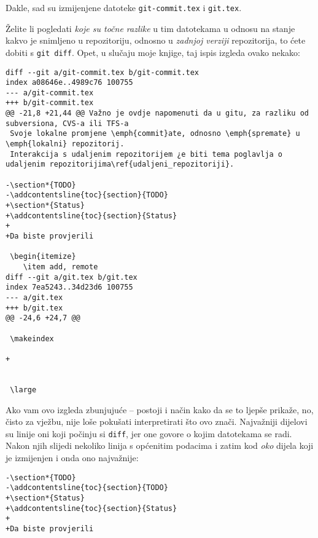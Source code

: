 Dakle, sad su izmijenjene datoteke \verb+git-commit.tex+ i \verb+git.tex+.

Želite li pogledati \emph{koje su točne razlike} u tim datotekama u odnosu na stanje kakvo je snimljeno u repozitoriju, odnosno u \emph{zadnjoj verziji} repozitorija, to ćete dobiti s \verb+git diff+. 
Opet, u slučaju moje knjige, taj ispis izgleda ovako nekako:

\begin{verbatim}
diff --git a/git-commit.tex b/git-commit.tex
index a08646e..4989c76 100755
--- a/git-commit.tex
+++ b/git-commit.tex
@@ -21,8 +21,44 @@ Važno je ovdje napomenuti da u gitu, za razliku od subversiona, CVS-a ili TFS-a
 Svoje lokalne promjene \emph{commit}ate, odnosno \emph{spremate} u \emph{lokalni} repozitorij.
 Interakcija s udaljenim repozitorijem ¿e biti tema poglavlja o udaljenim repozitorijima\ref{udaljeni_repozitoriji}.
 
-\section*{TODO}
-\addcontentsline{toc}{section}{TODO}
+\section*{Status}
+\addcontentsline{toc}{section}{Status}
+
+Da biste provjerili 
 
 \begin{itemize}
    \item add, remote
diff --git a/git.tex b/git.tex
index 7ea5243..34d23d6 100755
--- a/git.tex
+++ b/git.tex
@@ -24,6 +24,7 @@
 
 \makeindex
 
+
 
 
 \large

\end{verbatim}

Ako vam ovo izgleda zbunjujuće -- postoji i način kako da se to ljepše prikaže, no, čisto za vježbu, nije loše pokušati interpretirati što ovo znači.
Najvažniji dijelovi su linije oni koji počinju si \verb+diff+, jer one govore o kojim datotekama se radi.
Nakon njih slijedi nekoliko linija s općenitim podacima i zatim kod \emph{oko} dijela koji je izmijenjen i onda ono najvažnije:

\begin{verbatim}
-\section*{TODO}
-\addcontentsline{toc}{section}{TODO}
+\section*{Status}
+\addcontentsline{toc}{section}{Status}
+
+Da biste provjerili 
\end{verbatim}

